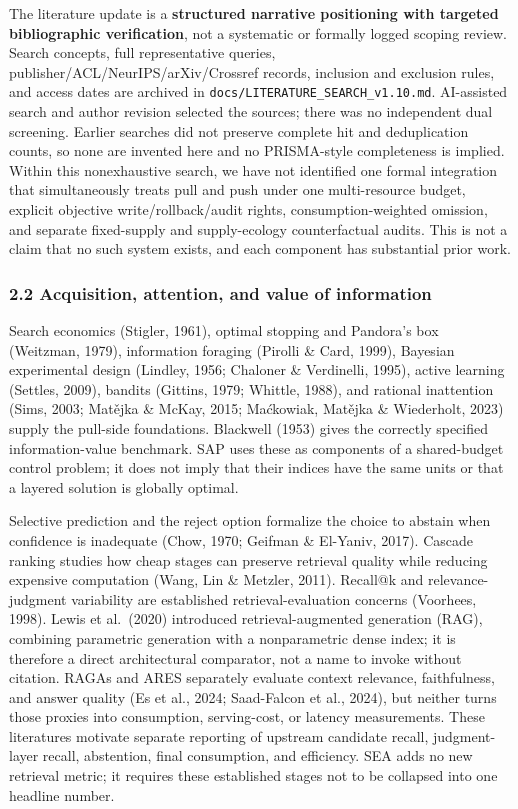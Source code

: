 \documentclass[
  11pt]{article}
\begin{document}
The literature update is a \textbf{structured narrative positioning with
targeted bibliographic verification}, not a systematic or formally
logged scoping review. Search concepts, full representative queries,
publisher/ACL/NeurIPS/arXiv/Crossref records, inclusion and exclusion
rules, and access dates are archived in
\texttt{docs/LITERATURE\_SEARCH\_v1.10.md}. AI-assisted search and
author revision selected the sources; there was no independent dual
screening. Earlier searches did not preserve complete hit and
deduplication counts, so none are invented here and no PRISMA-style
completeness is implied. Within this nonexhaustive search, we have not
identified one formal integration that simultaneously treats pull and
push under one multi-resource budget, explicit objective
write/rollback/audit rights, consumption-weighted omission, and separate
fixed-supply and supply-ecology counterfactual audits. This is not a
claim that no such system exists, and each component has substantial
prior work.

\subsubsection{2.2 Acquisition, attention, and value of
information}\label{acquisition-attention-and-value-of-information}

Search economics (Stigler, 1961), optimal stopping and Pandora's box
(Weitzman, 1979), information foraging (Pirolli \& Card, 1999), Bayesian
experimental design (Lindley, 1956; Chaloner \& Verdinelli, 1995),
active learning (Settles, 2009), bandits (Gittins, 1979; Whittle, 1988),
and rational inattention (Sims, 2003; Matějka \& McKay, 2015; Maćkowiak,
Matějka \& Wiederholt, 2023) supply the pull-side foundations. Blackwell
(1953) gives the correctly specified information-value benchmark. SAP
uses these as components of a shared-budget control problem; it does not
imply that their indices have the same units or that a layered solution
is globally optimal.

Selective prediction and the reject option formalize the choice to
abstain when confidence is inadequate (Chow, 1970; Geifman \& El-Yaniv,
2017). Cascade ranking studies how cheap stages can preserve retrieval
quality while reducing expensive computation (Wang, Lin \& Metzler,
2011). Recall@k and relevance-judgment variability are established
retrieval-evaluation concerns (Voorhees, 1998). Lewis et al.~(2020)
introduced retrieval-augmented generation (RAG), combining parametric
generation with a nonparametric dense index; it is therefore a direct
architectural comparator, not a name to invoke without citation. RAGAs
and ARES separately evaluate context relevance, faithfulness, and answer
quality (Es et al., 2024; Saad-Falcon et al., 2024), but neither turns
those proxies into consumption, serving-cost, or latency measurements.
These literatures motivate separate reporting of upstream candidate
recall, judgment-layer recall, abstention, final consumption, and
efficiency. SEA adds no new retrieval metric; it requires these
established stages not to be collapsed into one headline number.
\end{document}
